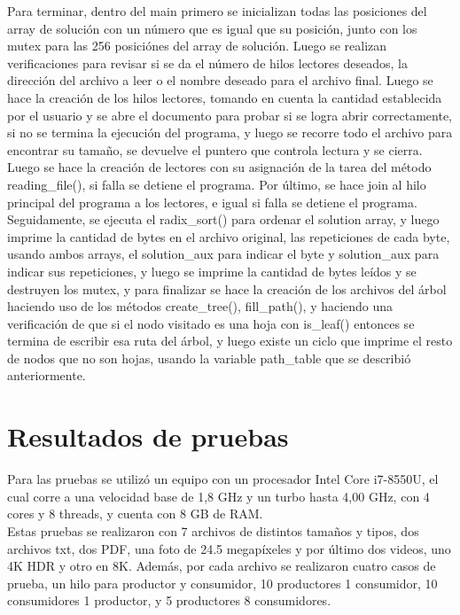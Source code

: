 \documentclass[12pt, article, natbib]{IEEEtran}
\begin{document}
Para terminar, dentro del main primero se inicializan todas las posiciones del array de solución con un número que es igual que su posición, junto con los mutex para las 256 posiciónes del array de solución. Luego se realizan verificaciones para revisar si se da el número de hilos lectores deseados, la dirección del archivo a leer o el nombre deseado para el archivo final. Luego se hace la creación de los hilos lectores, tomando en cuenta la cantidad establecida por el usuario y se abre el documento para probar si se logra abrir correctamente, si no se termina la ejecución del programa, y luego se recorre todo el archivo para encontrar su tamaño, se devuelve el puntero que controla lectura y se cierra. Luego se hace la creación de lectores con su asignación de la tarea del método reading\_file(), si falla se detiene el programa. Por último, se hace join al hilo principal del programa a los lectores, e igual si falla se detiene el programa.\cite{kerrisk_2010_pthread_join3} Seguidamente, se ejecuta el radix\_sort() para ordenar el solution array, y luego imprime la cantidad de bytes en el archivo original, las repeticiones de cada byte, usando ambos arrays, el solution\_aux para indicar el byte y solution\_aux para indicar sus repeticiones, y luego se imprime la cantidad de bytes leídos y se destruyen los mutex, y para finalizar se hace la creación de los archivos del árbol haciendo uso de los métodos create\_tree(), fill\_path(), y haciendo una verificación de que si el nodo visitado es una hoja con is\_leaf() entonces se termina de escribir esa ruta del árbol, y luego existe un ciclo que imprime el resto de nodos que no son hojas, usando la variable path\_table que se describió anteriormente.\\

\section{Resultados de pruebas}
Para las pruebas se utilizó un equipo con un procesador Intel Core i7-8550U, el cual corre a una velocidad base de 1,8 GHz y un turbo hasta 4,00 GHz, con 4 cores y 8 threads, y cuenta con 8 GB de RAM.\\

Estas pruebas se realizaron con 7 archivos de distintos tamaños y tipos, dos archivos txt, dos PDF, una foto de 24.5 megapíxeles y por último dos videos, uno 4K HDR y otro en 8K. Además, por cada archivo se realizaron cuatro casos de prueba, un hilo para productor y consumidor, 10 productores 1 consumidor, 10 consumidores 1 productor, y 5 productores 8 consumidores.\\
\end{document}
